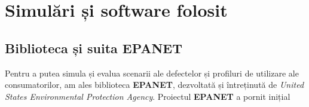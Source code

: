 \chapter{Simulări și software folosit}
\label{chap:simulari}

\section{Biblioteca și suita EPANET}

Pentru a putea simula și evalua scenarii ale defectelor și profiluri de utilizare ale consumatorilor, am ales biblioteca \textbf{EPANET}, dezvoltată și întreținută de \textit{United States Environmental Protection Agency}. Proiectul \textbf{EPANET} a pornit inițial 

